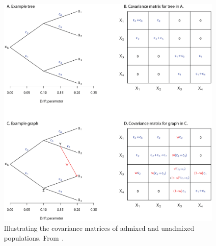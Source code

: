 \documentclass[12pt]{article}
\begin{document}
\begin{figure}
  \begin{center}
    \includegraphics[width=12cm]{treemix-figure.eps}
  \end{center}
  \caption{Illustrating the covariance matrices of admixed and
    unadmixed populations. From \cite{Pickrell-Pritchard-2012}.}\label{fig:treemix-figure}
\end{figure}




\ccLicense
\end{document}
